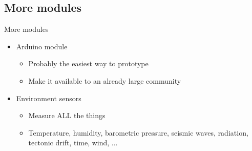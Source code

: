 \subsection{More modules}
	\begin{frame}{More modules}
		\begin{itemize}
			\item Arduino module
			\begin{itemize}
				\item Probably the easiest way to prototype
				\item Make it available to an already large community
			\end{itemize}
			\item Environment sensors
			\begin{itemize}
				\item Measure ALL the things
				\item Temperature, humidity, barometric pressure, seismic waves, radiation, tectonic drift, time, wind, ...
			\end{itemize}
		\end{itemize}
	\end{frame}

